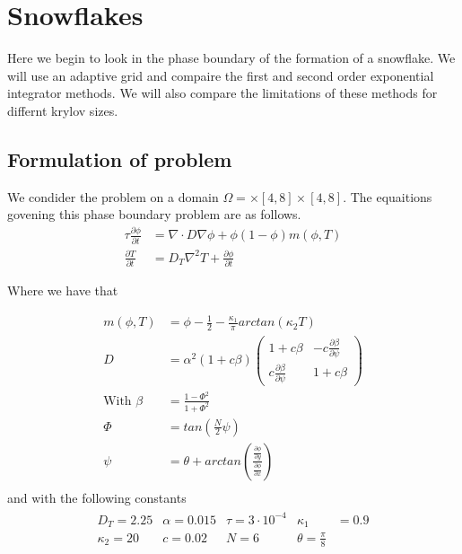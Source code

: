 \section {Snowflakes}
Here we begin to look in the phase boundary of the formation of a snowflake.
We will use an adaptive grid and compaire the first and second order exponential integrator methods.
We will also compare the limitations of these methods for differnt krylov sizes.
\subsection{Formulation of problem}

We condider the problem on a domain $\Omega = \times [4, 8] \times [4, 8]$.
The equaitions govening this phase boundary problem are as follows.
\begin{align*}
    \tau \frac{\partial \phi}{\partial t} &= \nabla \cdot D\nabla\phi +  \phi(1-\phi)m(\phi,T)\\
    \frac{\partial T}{\partial t} &= D_T \nabla ^2T + \frac{\partial \phi}{\partial t}
\end{align*}

Where we have that

\begin{align*}
    m(\phi, T) &= \phi - \frac 12 - \frac{\kappa_1}{\pi}arctan(\kappa_2 T)\\
    D &= \alpha^2(1+c\beta)
    \begin{pmatrix}
        1+c\beta & -c\frac{\partial\beta}{\partial\psi}\\
        c\frac{\partial\beta}{\partial\psi} & 1+c\beta
    \end{pmatrix}\\
    \text{With }\beta &= \frac{1-\Phi^2}{1+\Phi^2}\\
    \Phi &= tan(\frac N2\psi)\\
    \psi &= \theta + arctan(\frac{\frac{\partial \phi}{\partial y}}{\frac{\partial \phi}{\partial x}})\\
\end{align*}
and with the following constants
\begin{align*}
    \begin{matrix}
    D_T = 2.25 & \alpha = 0.015 & \tau = 3\cdot 10^{-4} & \kappa_1 &= 0.9\\
    \kappa_2 = 20 & c = 0.02 & N = 6 & \theta = \frac{\pi}8
    \end{matrix}
\end{align*}

